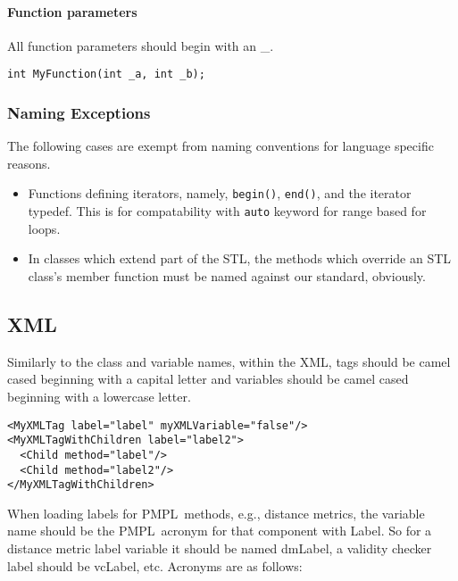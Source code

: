 \documentclass[12pt]{article}
\newcommand{\pmpl}{PMPL}
\begin{document}
\paragraph{Function parameters}

All function parameters should begin with an \_.

\begin{lstlisting}
int MyFunction(int _a, int _b);
\end{lstlisting}

\subsubsection{Naming Exceptions}

The following cases are exempt from naming conventions for language specific
reasons.

\begin{itemize}

  \item Functions defining iterators, namely, \texttt{begin()}, \texttt{end()},
    and the iterator typedef. This is for compatability with \texttt{auto}
    keyword for range based for loops.

  \item In classes which extend part of the STL, the methods which override an
    STL class's member function must be named against our standard, obviously.

\end{itemize}

\subsection{XML}
Similarly to the class and variable names, within the XML, tags should be camel
cased beginning with a capital letter and variables should be camel cased
beginning with a lowercase letter.

\lstset{style=XML}
\begin{lstlisting}
<MyXMLTag label="label" myXMLVariable="false"/>
<MyXMLTagWithChildren label="label2">
  <Child method="label"/>
  <Child method="label2"/>
</MyXMLTagWithChildren>
\end{lstlisting}
\lstset{style=C++}

When loading labels for \pmpl\ methods, e.g., distance metrics, the variable
name should be the \pmpl\ acronym for that component with Label. So for a
distance metric label variable it should be named dmLabel, a validity checker
label should be vcLabel, etc. Acronyms are as follows:
\end{document}
